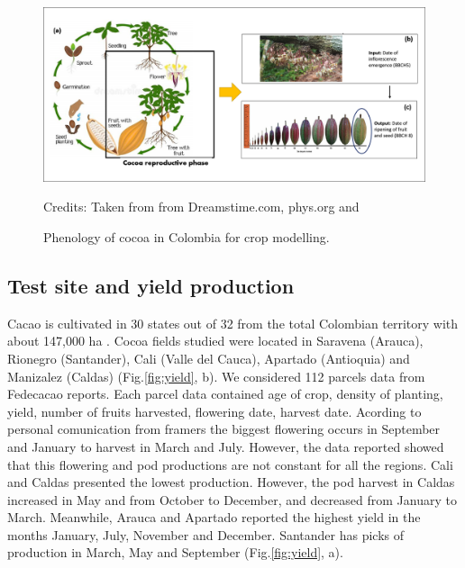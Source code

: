 \documentclass[gene,journal,article,submit,moreauthors,pdftex]{Definitions/mdpi}
\begin{document}
\begin{figure}[h!]
	\centering
	\includegraphics[scale=0.4]{images/phenology.png}\\
	\caption{\footnotesize {Phenology of cocoa in Colombia for crop modelling.\\}} 
	\footnotesize{Credits: Taken from from Dreamstime.com, phys.org \citep{toledo2021} and \cite{lopez2018}}
	\label{fig:pheno}
\end{figure}



\subsection{Test site and yield production }
Cacao is cultivated in 30 states out of 32 from the total Colombian territory with about 147,000 ha \citep{Meza2021}. Cocoa fields studied were located in Saravena (Arauca), Rionegro (Santander), Cali (Valle del Cauca), Apartado (Antioquia) and Manizalez (Caldas) (Fig.\ref{fig:yield}, b). We considered 112 parcels data from Fedecacao reports. Each parcel data contained age of crop, density of planting, yield, number of fruits harvested, flowering date, harvest date.   Acording to personal comunication from framers the biggest flowering occurs in September and January to harvest in March and July. However, the data reported showed that this flowering and pod productions are not constant for all the regions.  Cali and Caldas presented the lowest production. However, the pod harvest in Caldas increased in May and from October to December, and decreased from January to March.  Meanwhile, Arauca and Apartado reported the highest yield in the months January, July, November and December. Santander has picks of production in March, May and September (Fig.\ref{fig:yield}, a).
\end{document}
